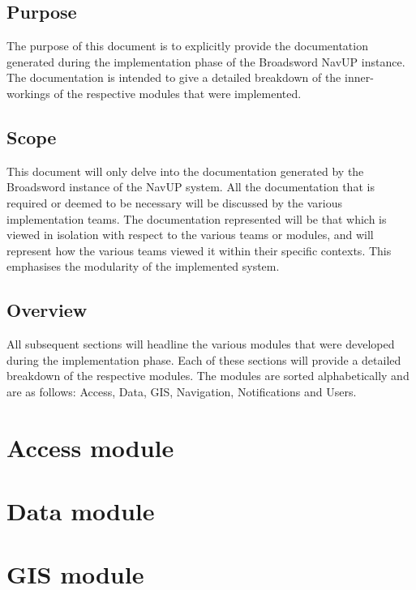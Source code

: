 \documentclass{article}
\begin{document}
		\subsection{Purpose}\label{sec:intro-purpose}
		The purpose of this document is to explicitly provide the documentation generated during the implementation phase of the Broadsword NavUP instance. The documentation is intended to give a detailed breakdown of the inner-workings of the respective modules that were implemented.
		
		\subsection{Scope}\label{sec:intro-scope}
		This document will only delve into the documentation generated by the Broadsword instance of the NavUP system. All the documentation that is required or deemed to be necessary will be discussed by the various implementation teams. The documentation represented will be that which is viewed in isolation with respect to the various teams or modules, and will represent how the various teams viewed it within their specific contexts. This emphasises the modularity of the implemented system.
		
		
		\subsection{Overview}\label{sec:intro-overview}
		All subsequent sections will headline the various modules that were developed during the implementation phase. Each of these sections will provide a detailed breakdown of the respective modules. The modules are sorted alphabetically and are as follows: Access, Data, GIS, Navigation, Notifications and Users.
	
		
	\clearpage
		
	\section{Access module}\label{sec:access}

		
		
	\clearpage

	\section{Data module}\label{sec:data}
	
		

	\clearpage
	
	\section{GIS module}\label{sec:gis}
	
\end{document}
